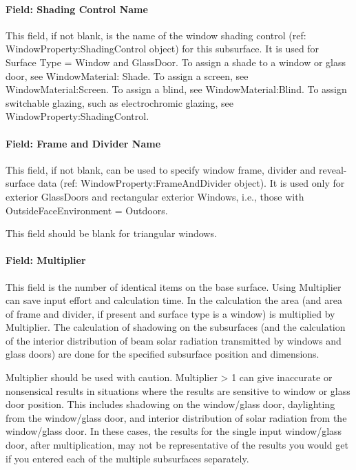\paragraph{Field: Shading Control Name}\label{field-shading-control-name-1}

This field, if not blank, is the name of the window shading control (ref: WindowProperty:ShadingControl object) for this subsurface. It is used for Surface Type = Window and GlassDoor. To assign a shade to a window or glass door, see WindowMaterial: Shade. To assign a screen, see WindowMaterial:Screen. To assign a blind, see WindowMaterial:Blind. To assign switchable glazing, such as electrochromic glazing, see WindowProperty:ShadingControl.

\paragraph{Field: Frame and Divider Name}\label{field-frame-and-divider-name-1}

This field, if not blank, can be used to specify window frame, divider and reveal-surface data (ref: WindowProperty:FrameAndDivider object). It is used only for exterior GlassDoors and rectangular exterior Windows, i.e., those with OutsideFaceEnvironment = Outdoors.

This field should be blank for triangular windows.

\paragraph{Field: Multiplier}\label{field-multiplier-3}

This field is the number of identical items on the base surface. Using Multiplier can save input effort and calculation time. In the calculation the area (and area of frame and divider, if present and surface type is a window) is multiplied by Multiplier. The calculation of shadowing on the subsurfaces (and the calculation of the interior distribution of beam solar radiation transmitted by windows and glass doors) are done for the specified subsurface position and dimensions.

Multiplier should be used with caution. Multiplier \textgreater{} 1 can give inaccurate or nonsensical results in situations where the results are sensitive to window or glass door position. This includes shadowing on the window/glass door, daylighting from the window/glass door, and interior distribution of solar radiation from the window/glass door. In these cases, the results for the single input window/glass door, after multiplication, may not be representative of the results you would get if you entered each of the multiple subsurfaces separately.

